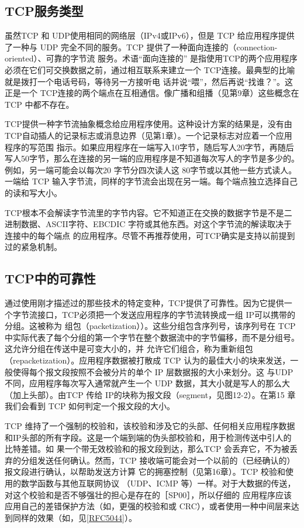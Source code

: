 \subsection{TCP服务类型}
虽然TCP 和 UDP使用相同的网络层（IPv4或IPv6），但是 TCP 给应用程序提供了一种与 UDP 完全不同的服务。TCP 提供了一种面向连接的（connection-oriented）、可靠的字节流
服务。术语“面向连接的” 是指使用TCP的两个应用程序必须在它们可交换数据之前，通过相互联系来建立一个 TCP连接。最典型的比喻就是拨打一个电话号码，等待另一方接听电
话并说“喂”，然后再说“找谁？”。这正是一个 TCP连接的两个端点在互相通信。像广播和组播（见第9章）这些概念在 TCP 中都不存在。

TCP提供一种字节流抽象概念给应用程序使用。这种设计方案的结果是，没有由TCP自动插人的记录标志或消息边界（见第1章）。一个记录标志对应着一个应用程序的写范围
指示。如果应用程序在一端写入10字节，随后写人20字节，再随后写人50字节，那么在连接的另一端的应用程序是不知道每次写人的字节是多少的。例如，另一端可能会以每次20
字节分四次读人这 80字节或以其他一些方式读人。一端给 TCP 输入字节流，同样的字节流会出现在另一端。每个端点独立选择自己的读和写大小。

TCP根本不会解读字节流里的字节内容。它不知道正在交换的数据字节是不是二进制数据、ASCII字符、EBCDIC 字符或其他东西。对这个字节流的解读取决于连接中的每个端点
的应用程序。尽管不再推荐使用，可TCP确实是支持以前提到过的紧急机制。
\subsection{TCP中的可靠性}
通过使用刚才描述过的那些技术的特定变种，TCP提供了可靠性。因为它提供一个字节流接口，TCP必须把一个发送应用程序的字节流转换成一组 IP可以携带的分组。这被称为
组包（packetization））。这些分组包含序列号，该序列号在 TCP 中实际代表了每个分组的第一个字节在整个数据流中的字节偏移，而不是分组号。这允许分组在传送中是可变大小的，并
允许它们组合，称为重新组包（repacketization）。应用程序数据被打散成 TCP 认为的最佳大小的块来发送，一般使得每个报文段按照不会被分片的单个 IP 层数据报的大小来划分。这
与UDP 不同，应用程序每次写入通常就产生一个 UDP 数据，其大小就是写人的那么大（加上头部）。由TCP 传给 IP的块称为报文段（segment，见图12-2）。在第15 章我们会看到
TCP 如何判定一个报文段的大小。

TCP 维持了一个强制的校验和，该校验和涉及它的头部、任何相关应用程序数据和IP头部的所有字段。这是一个端到端的伪头部校验和，用于检测传送中引人的比特差错。如
果一个带无效校验和的报文段到达，那么TCP 会丢弃它，不为被丢弃的分组发送任何确认。然而，TCP 接收端可能会对一个以前的（已经确认的）报文段进行确认，以帮助发送方计算
它的拥塞控制（见第16章）。TCP 校验和使用的数学函数与其他互联网协议 （UDP、ICMP 等）一样。对于大数据的传送，对这个校验和是否不够强壮的担心是存在的［SP00］，所以仔细的
应用程序应该应用自己的差错保护方法（如，更强的校验和或 CRC），或者使用一种中间层来达到同样的效果（如，见\href{https://www.rfc-editor.org/rfc/rfc5044}{[RFC5044]}）。

